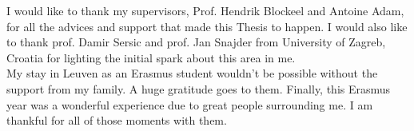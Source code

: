 \documentclass[master=mai,english,openright,fleqn]{kulemt}
\begin{document}
\begin{preface}

	I would like to thank my supervisors, Prof. Hendrik Blockeel and Antoine Adam, for all the advices and support that made this Thesis to happen. I would also like to thank prof. Damir Sersic and prof. Jan Snajder from University of Zagreb, Croatia for lighting the initial spark about this area in me. \\
	
	My stay in Leuven as an Erasmus student wouldn't be possible without the support from my family. A huge gratitude  goes to them. Finally, this Erasmus year was a wonderful experience due to great people surrounding me. I am thankful for all of those moments with them.
\end{preface}

\tableofcontents*
\end{document}
